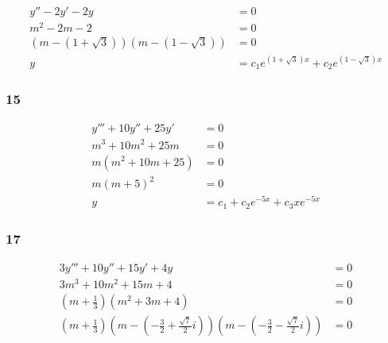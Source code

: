 \documentclass{article}
\begin{document}
\begin{align*}
  y'' - 2y' - 2y                            & = 0                                                   \\
  m^2 - 2m - 2                              & = 0                                                   \\
  (m - (1 + \sqrt{3})) (m - (1 - \sqrt{3})) & = 0                                                   \\
  y                                         & = c_1 e^{(1 + \sqrt{3}) x} + c_2 e^{(1 - \sqrt{3}) x}
\end{align*}

\subsubsection{15}

\begin{align*}
  y''' + 10 y'' + 25 y' & = 0                                 \\
  m^3 + 10 m^2 + 25 m   & = 0                                 \\
  m (m^2 + 10 m + 25)   & = 0                                 \\
  m (m + 5)^2           & = 0                                 \\
  y                     & = c_1 + c_2 e^{-5x} + c_3 x e^{-5x}
\end{align*}

\subsubsection{17}

\begin{align*}
  3 y''' + 10 y'' + 15 y' + 4 y                                                                                                                                              & = 0 \\
  3 m^3 + 10 m^2 + 15 m + 4                                                                                                                                                  & = 0 \\
  \left( m + \frac{1}{3} \right) (m^2 + 3 m + 4)                                                                                                                             & = 0 \\
  \left( m + \frac{1}{3} \right) \left( m - \left( -\frac{3}{2} + \frac{\sqrt{7}}{2} i \right) \right) \left( m - \left( -\frac{3}{2} - \frac{\sqrt{7}}{2} i \right) \right) & = 0
\end{align*}
\end{document}
